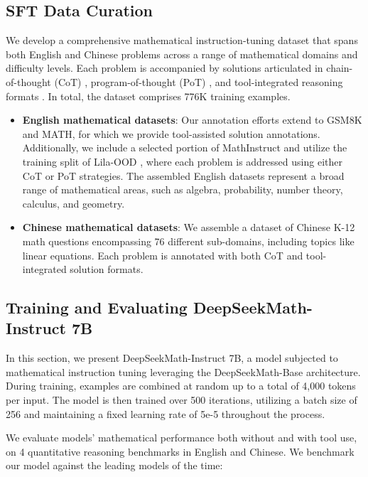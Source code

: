 \begin{itemize}[topsep=0pt]
\subsection{SFT Data Curation}

We develop a comprehensive mathematical instruction-tuning dataset that spans both English and Chinese problems across a range of mathematical domains and difficulty levels. Each problem is accompanied by solutions articulated in chain-of-thought (CoT) \citep{cot}, program-of-thought (PoT) \citep{pot,pal}, and tool-integrated reasoning formats \citep{tora}. In total, the dataset comprises 776K training examples.

\begin{itemize}[topsep=0pt]
    \item \textbf{English mathematical datasets}: Our annotation efforts extend to GSM8K and MATH, for which we provide tool-assisted solution annotations. Additionally, we include a selected portion of MathInstruct \citep{MathInstruct} and utilize the training split of Lila-OOD \citep{lila}, where each problem is addressed using either CoT or PoT strategies. The assembled English datasets represent a broad range of mathematical areas, such as algebra, probability, number theory, calculus, and geometry.
    \item \textbf{Chinese mathematical datasets}: We assemble a dataset of Chinese K-12 math questions encompassing 76 different sub-domains, including topics like linear equations. Each problem is annotated with both CoT and tool-integrated solution formats.
\end{itemize}

\subsection{Training and Evaluating DeepSeekMath-Instruct 7B}

In this section, we present DeepSeekMath-Instruct 7B, a model subjected to mathematical instruction tuning leveraging the DeepSeekMath-Base architecture. During training, examples are combined at random up to a total of 4,000 tokens per input. The model is then trained over 500 iterations, utilizing a batch size of 256 and maintaining a fixed learning rate of 5e-5 throughout the process.

We evaluate models' mathematical performance both without and with tool use, on 4 quantitative reasoning benchmarks in English and Chinese. We benchmark our model against the leading models of the time:


\end{itemize}
